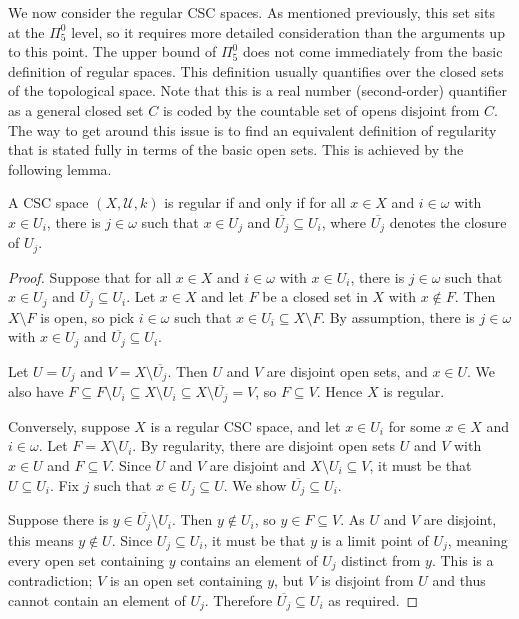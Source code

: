 \documentclass[11pt]{amsart}
\theoremstyle{remark}
\begin{document}
We now consider the regular CSC spaces.
As mentioned previously, this set sits at the $\Pi_5^0$ level, so it requires more detailed consideration than the arguments up to this point. 
The upper bound of $\Pi_5^0$ does not come immediately from the basic definition of regular spaces.
This definition usually quantifies over the closed sets of the topological space.
Note that this is a real number (second-order) quantifier as a general closed set $C$ is coded by the countable set of opens disjoint from $C$.
The way to get around this issue is to find an equivalent definition of regularity that is stated fully in terms of the basic open sets.
This is achieved by the following lemma. 

\begin{lemma}
    A CSC space $(X, \mathcal{U}, k)$ is regular if and only if for all $x \in X$ and $i \in \omega$ with $x \in U_i$, there is $j \in \omega$ such that $x \in U_j$ and $\overline{U_j} \subseteq U_i$, where $\overline{U_j}$ denotes the closure of $U_j$.
\end{lemma}
\begin{proof}
    Suppose that for all $x \in X$ and $i \in \omega$ with $x \in U_i$, there is $j \in \omega$ such that $x \in U_j$ and $\overline{U_j} \subseteq U_i$. Let $x \in X$ and let $F$ be a closed set in $X$ with $x \notin F$. Then $X \setminus F$ is open, so pick $i \in \omega$ such that $x \in U_i \subseteq X \setminus F$. By assumption, there is $j \in \omega$ with $x \in U_j$ and $\overline{U_j} \subseteq U_i$.

    Let $U = U_j$ and $V = X \setminus \overline{U_j}$. Then $U$ and $V$ are disjoint open sets, and $x \in U$. We also have $F \subseteq F \setminus U_i \subseteq X \setminus U_i \subseteq X \setminus \overline{U_j} = V$, so $F \subseteq V$. Hence $X$ is regular.

    Conversely, suppose $X$ is a regular CSC space, and let $x \in U_i$ for some $x \in X$ and $i \in \omega$. Let $F = X \setminus U_i$. By regularity, there are disjoint open sets $U$ and $V$ with $x \in U$ and $F \subseteq V$. Since $U$ and $V$ are disjoint and $X \setminus U_i \subseteq V$, it must be that $U \subseteq U_i$. Fix $j$ such that $x \in U_j \subseteq U$. We show $\overline{U_j} \subseteq U_i$.

    Suppose there is $y \in \overline{U_j} \setminus U_i$. Then $y \notin U_i$, so $y \in F \subseteq V$. As $U$ and $V$ are disjoint, this means $y \notin U$. Since $U_j \subseteq U_i$, it must be that $y$ is a limit point of $U_j$, meaning every open set containing $y$ contains an element of $U_j$ distinct from $y$. This is a contradiction; $V$ is an open set containing $y$, but $V$ is disjoint from $U$ and thus cannot contain an element of $U_j$. Therefore $\overline{U_j} \subseteq U_i$ as required.
\end{proof}
\end{document}
